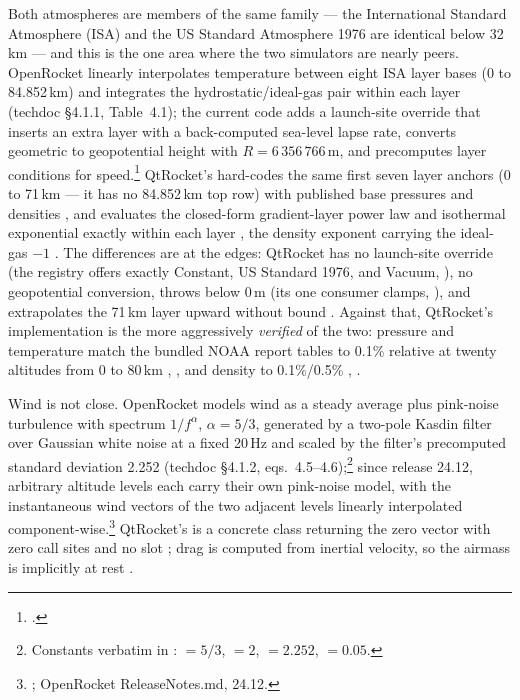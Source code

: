 Both atmospheres are members of the same family --- the International Standard Atmosphere
(ISA) and the US Standard Atmosphere 1976 are identical below 32\,km --- and this is the one
area where the two simulators are nearly peers. OpenRocket linearly interpolates temperature
between eight ISA layer bases (0 to 84.852\,km) and integrates the hydrostatic/ideal-gas
pair within each layer (techdoc \S 4.1.1, Table~4.1); the current code adds a launch-site
override that inserts an extra layer with a back-computed sea-level lapse rate, converts
geometric to geopotential height with $R = 6\,356\,766$\,m, and precomputes layer conditions
for speed.\footnote{.} QtRocket's
 hard-codes the same first seven layer anchors (0 to 71\,km ---
it has no 84.852\,km top row) with published base pressures and densities
, and evaluates the closed-form gradient-layer power
law and isothermal exponential exactly within each layer
, the density exponent carrying the ideal-gas
$-1$ . The differences are at the edges: QtRocket has
no launch-site override (the registry offers exactly Constant, US Standard 1976, and Vacuum,
), no geopotential conversion, throws below $0$\,m
 (its one consumer clamps, ), and
extrapolates the 71\,km layer upward without bound . Against that,
QtRocket's implementation is the more aggressively \emph{verified} of the two: pressure and
temperature match the bundled NOAA report tables to 0.1\% relative at twenty altitudes from
0 to 80\,km ,
, and density to 0.1\%/0.5\%
,
.

Wind is not close. OpenRocket models wind as a steady average plus pink-noise turbulence
with spectrum $1/f^{\alpha}$, $\alpha = 5/3$, generated by a two-pole Kasdin filter over
Gaussian white noise at a fixed 20\,Hz and scaled by the filter's precomputed standard
deviation 2.252 (techdoc \S 4.1.2, eqs.~4.5--4.6);\footnote{Constants verbatim in
:  $=5/3$,  $=2$,
 $=2.252$,  $=0.05$.} since release 24.12, arbitrary altitude
levels each carry their own pink-noise model, with the instantaneous wind vectors of the two
adjacent levels linearly interpolated component-wise.\footnote{%
; OpenRocket ReleaseNotes.md, 24.12.}
QtRocket's  is a concrete class returning the zero vector
 with zero call sites and no  slot
; drag is computed from inertial velocity, so the airmass is
implicitly at rest .

